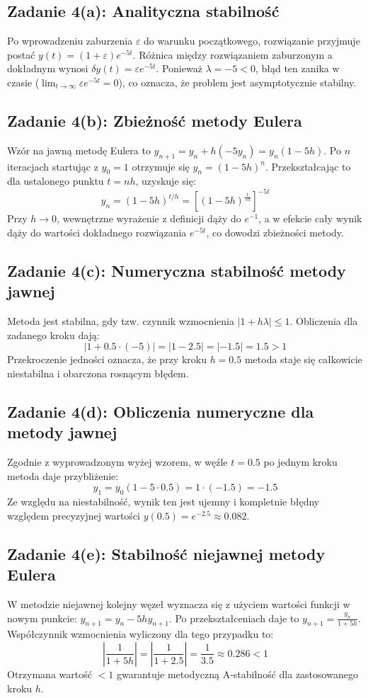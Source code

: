 \documentclass[12pt, a4paper]{article}
\begin{document}
\subsection{Zadanie 4(a): Analityczna stabilność}
Po wprowadzeniu zaburzenia $\varepsilon$ do warunku początkowego, rozwiązanie przyjmuje postać $y(t) = (1+\varepsilon)e^{-5t}$. Różnica między rozwiązaniem zaburzonym a dokładnym wynosi $\delta y(t) = \varepsilon e^{-5t}$. Ponieważ $\lambda = -5 < 0$, błąd ten zanika w czasie ($\lim_{t \to \infty} \varepsilon e^{-5t} = 0$), co oznacza, że problem jest asymptotycznie stabilny.

\subsection{Zadanie 4(b): Zbieżność metody Eulera}
Wzór na jawną metodę Eulera to $y_{n+1} = y_n + h(-5y_n) = y_n(1-5h)$. Po $n$ iteracjach startując z $y_0 = 1$ otrzymuje się $y_n = (1-5h)^n$. Przekształcając to dla ustalonego punktu $t = nh$, uzyskuje się:
\[
  y_n = (1-5h)^{t/h} = \left[ (1-5h)^{\frac{1}{5h}} \right]^{-5t}
\]
Przy $h \to 0$, wewnętrzne wyrażenie z definicji dąży do $e^{-1}$, a w efekcie cały wynik dąży do wartości dokładnego rozwiązania $e^{-5t}$, co dowodzi zbieżności metody.

\subsection{Zadanie 4(c): Numeryczna stabilność metody jawnej}
Metoda jest stabilna, gdy tzw. czynnik wzmocnienia $|1 + h\lambda| \leq 1$. Obliczenia dla zadanego kroku dają:
\[
  |1 + 0.5 \cdot (-5)| = |1 - 2.5| = |-1.5| = 1.5 > 1
\]
Przekroczenie jedności oznacza, że przy kroku $h=0.5$ metoda staje się całkowicie niestabilna i obarczona rosnącym błędem.

\subsection{Zadanie 4(d): Obliczenia numeryczne dla metody jawnej}
Zgodnie z wyprowadzonym wyżej wzorem, w węźle $t=0.5$ po jednym kroku metoda daje przybliżenie:
\[
  y_1 = y_0(1-5 \cdot 0.5) = 1 \cdot (-1.5) = -1.5
\]
Ze względu na niestabilność, wynik ten jest ujemny i kompletnie błędny względem precyzyjnej wartości $y(0.5) = e^{-2.5} \approx 0.082$.

\subsection{Zadanie 4(e): Stabilność niejawnej metody Eulera}
W metodzie niejawnej kolejny węzeł wyznacza się z użyciem wartości funkcji w nowym punkcie: $y_{n+1} = y_n - 5h y_{n+1}$. Po przekształceniach daje to $y_{n+1} = \frac{y_n}{1 + 5h}$. Współczynnik wzmocnienia wyliczony dla tego przypadku to:
\[
  \left|\frac{1}{1+5h}\right| = \left|\frac{1}{1+2.5}\right| = \frac{1}{3.5} \approx 0.286 < 1
\]
Otrzymana wartość $< 1$ gwarantuje metodyczną A-stabilność dla zastosowanego kroku $h$.
\end{document}
